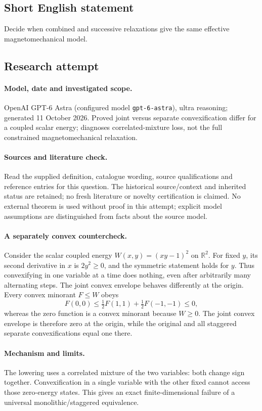\documentclass[11pt]{article}
\begin{document}
\subsection{Short English statement}
Decide when combined and successive relaxations give the same effective magnetomechanical model.
\subsection{Research attempt}
\paragraph{Model, date and investigated scope.}
OpenAI GPT-6 Astra (configured model \texttt{gpt-6-astra}), ultra reasoning; generated 11 October 2026. Proved joint versus separate convexification differ for a coupled scalar energy; diagnoses correlated-mixture loss, not the full constrained magnetomechanical relaxation.

\paragraph{Sources and literature check.}
Read the supplied definition, catalogue wording, source qualifications and reference entries for this question. The historical source/context and inherited status are retained; no fresh literature or novelty certification is claimed. No external theorem is used without proof in this attempt; explicit model assumptions are distinguished from facts about the source model.

\paragraph{A separately convex countercheck.} Consider the scalar coupled energy \(W(x,y)=(xy-1)^2\) on \(\mathbb R^2\). For fixed \(y\), its second derivative in \(x\) is \(2y^2\ge0\), and the symmetric statement holds for \(y\). Thus convexifying in one variable at a time does nothing, even after arbitrarily many alternating steps.
The joint convex envelope behaves differently at the origin. Every convex minorant \(F\le W\) obeys
\[
 F(0,0)\le\tfrac12F(1,1)+\tfrac12F(-1,-1)\le0,
\]
whereas the zero function is a convex minorant because \(W\ge0\). The joint convex envelope is therefore zero at the origin, while the original and all staggered separate convexifications equal one there.
\paragraph{Mechanism and limits.} The lowering uses a correlated mixture of the two variables: both change sign together. Convexification in a single variable with the other fixed cannot access those zero-energy states. This gives an exact finite-dimensional failure of a universal monolithic/staggered equivalence.
\end{document}
